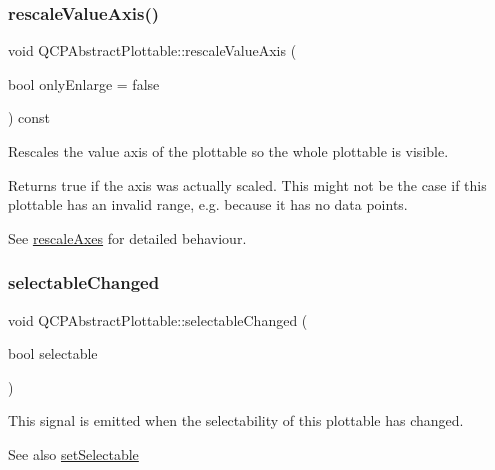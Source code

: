 \subsubsection{\texorpdfstring{rescale\+Value\+Axis()}{rescaleValueAxis()}}
{\footnotesize\ttfamily void Q\+C\+P\+Abstract\+Plottable\+::rescale\+Value\+Axis (\begin{DoxyParamCaption}\item[{bool}]{only\+Enlarge = {\ttfamily false} }\end{DoxyParamCaption}) const}

Rescales the value axis of the plottable so the whole plottable is visible.

Returns true if the axis was actually scaled. This might not be the case if this plottable has an invalid range, e.\+g. because it has no data points.

See \hyperlink{class_q_c_p_abstract_plottable_a1491c4a606bccd2d09e65e11b79eb882}{rescale\+Axes} for detailed behaviour. \hypertarget{class_q_c_p_abstract_plottable_a0059caa3f3581f3959660fef8cbb71c4}{}\label{class_q_c_p_abstract_plottable_a0059caa3f3581f3959660fef8cbb71c4} 
\subsubsection{\texorpdfstring{selectable\+Changed}{selectableChanged}}
{\footnotesize\ttfamily void Q\+C\+P\+Abstract\+Plottable\+::selectable\+Changed (\begin{DoxyParamCaption}\item[{bool}]{selectable }\end{DoxyParamCaption})\hspace{0.3cm}{\ttfamily [signal]}}

This signal is emitted when the selectability of this plottable has changed.

\begin{DoxySeeAlso}{See also}
\hyperlink{class_q_c_p_abstract_plottable_a22c69299eb5569e0f6bf084877a37dc4}{set\+Selectable} 
\end{DoxySeeAlso}
\hypertarget{class_q_c_p_abstract_plottable_a3af66432b1dca93b28e00e78a8c7c1d9}{}\label{class_q_c_p_abstract_plottable_a3af66432b1dca93b28e00e78a8c7c1d9} 
